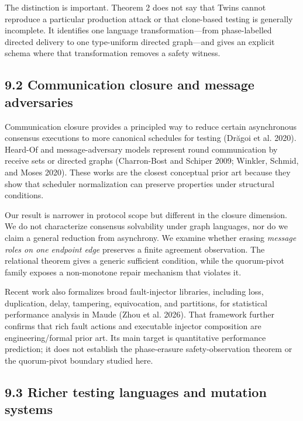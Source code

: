 \documentclass[10pt,a4paper]{article}
\begin{document}
The distinction is important. Theorem 2 does not say that Twins cannot
reproduce a particular production attack or that clone-based testing is
generally incomplete. It identifies one language transformation---from
phase-labelled directed delivery to one type-uniform directed
graph---and gives an explicit schema where that transformation removes a
safety witness.

\subsection{9.2 Communication closure and message
adversaries}\label{communication-closure-and-message-adversaries}

Communication closure provides a principled way to reduce certain
asynchronous consensus executions to more canonical schedules for
testing (Drăgoi et al. 2020). Heard-Of and message-adversary models
represent round communication by receive sets or directed graphs
(Charron-Bost and Schiper 2009; Winkler, Schmid, and Moses 2020). These
works are the closest conceptual prior art because they show that
scheduler normalization can preserve properties under structural
conditions.

Our result is narrower in protocol scope but different in the closure
dimension. We do not characterize consensus solvability under graph
languages, nor do we claim a general reduction from asynchrony. We
examine whether erasing \emph{message roles on one endpoint edge}
preserves a finite agreement observation. The relational theorem gives a
generic sufficient condition, while the quorum-pivot family exposes a
non-monotone repair mechanism that violates it.

Recent work also formalizes broad fault-injector libraries, including
loss, duplication, delay, tampering, equivocation, and partitions, for
statistical performance analysis in Maude (Zhou et al. 2026). That
framework further confirms that rich fault actions and executable
injector composition are engineering/formal prior art. Its main target
is quantitative performance prediction; it does not establish the
phase-erasure safety-observation theorem or the quorum-pivot boundary
studied here.

\subsection{9.3 Richer testing languages and mutation
systems}\label{richer-testing-languages-and-mutation-systems}
\end{document}
